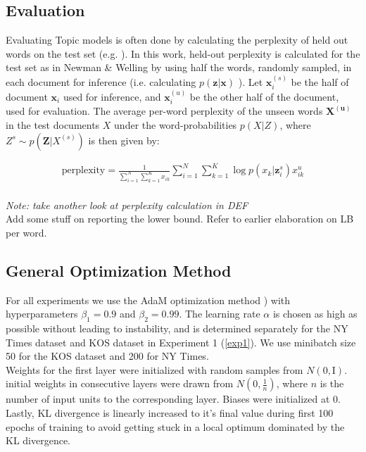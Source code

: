 \documentclass{report}
\begin{document}
	\subsection{Evaluation}
	Evaluating Topic models is often done by calculating the perplexity of held out words on the test set (e.g. \cite{blei2003latent, newman2007distributed, ranganath2015deep}). In this work, held-out perplexity is calculated for the test set as in Newman \& Welling \cite{newman2007distributed} by using half the words, randomly sampled, in each document for inference (i.e. calculating $p(\mathbf{z}|\mathbf{x})$ ). Let $\mathbf{x}_{i}^{(s)}$ be the half of document $\mathbf{x}_i$ used for inference, and $\mathbf{x}_{i}^{(u)}$ be the other half of the document, used for evaluation. The average per-word perplexity of the unseen words $\mathbf{X^{(u)}}$ in the test documents $X$ under the word-probabilities $p(X|Z)$, where $Z^s \sim p(\mathbf{Z}|X^{(s)})$ is then given by:
	
	
	\begin{align}
	\text{perplexity} =  \frac{1}{\sum\limits_{i=1}^{N}\sum\limits_{k=1}^{K}x_{ik}}\sum\limits_{i=1}^N\sum\limits_{k=1}^{K} \log p(x_{k}|\mathbf{z}_{i}^{s})x_{ik}^{u}
	\end{align}\\
	\textit{Note: take another look at perplexity calculation in DEF}
	\\
	Add some stuff on reporting the lower bound. Refer to earlier elaboration on LB per word.
	
	\subsection{General Optimization Method}\label{optim_section}
	For all experiments we use the AdaM optimization method \cite{kingma2014adam}) with hyperparameters $\beta_1 = 0.9$ and $\beta_2 = 0.99$. The learning rate $\alpha$ is chosen as high as possible without leading to instability, and is determined separately for the NY Times dataset and KOS dataset in Experiment 1 (\ref{exp1}). We use minibatch size 50 for the KOS dataset and 200 for NY Times.  \\
	Weights for the first layer were initialized with random samples from $N(0,\text{I})$. initial weights in consecutive layers were drawn from  $N(0,\frac{1}{n})$, where $n$ is the number of input units to the corresponding layer. Biases were initialized at 0.
	\\Lastly, KL divergence is linearly increased to it's final value during first 100 epochs of training to avoid getting stuck in a local optimum dominated by the KL divergence. 	
\end{document}

